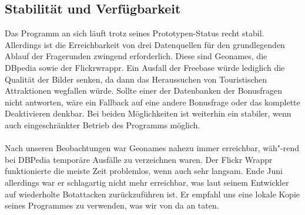 \documentclass[a4paper, 11pt]{article}
\begin{document}
\subsection{Stabilität und Verfügbarkeit}
Das Programm an sich läuft trotz seines Prototypen-Status recht stabil. Allerdings ist die Erreichbarkeit von drei Datenquellen für den grundlegenden Ablauf der Fragerunden zwingend erforderlich. Diese sind Geonames, die DBpedia sowie der Flickrwrappr. Ein Ausfall der Freebase würde lediglich die Qualität der Bilder senken, da dann das Heraussuchen von Touristischen Attraktionen wegfallen würde. Sollte einer der Datenbanken der Bonusfragen nicht antworten, wäre ein Fallback auf eine andere Bonusfrage oder das komplette Deaktivieren denkbar. Bei beiden Möglichkeiten ist weiterhin ein stabiler, wenn auch eingeschränkter Betrieb des Programms möglich.\\\\ 
Nach unseren Beobachtungen war Geonames nahezu immer erreichbar, wäh"-rend bei DBPedia temporäre Ausfälle zu verzeichnen waren. Der Flickr Wrappr funktionierte die meiste Zeit problemlos, wenn auch sehr langsam. Ende Juni allerdings war er schlagartig nicht mehr erreichbar, was laut seinem Entwickler auf wiederholte Botattacken zurückzuführen ist. Er empfahl uns eine lokale Kopie seines Programmes zu verwenden, was wir von da an taten.
\end{document}
